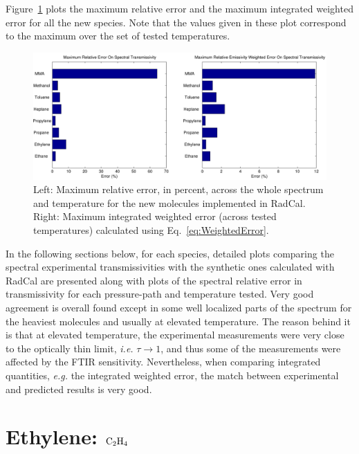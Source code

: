 Figure~\ref{fig:Verify_All} plots the maximum relative error and the maximum integrated weighted error for all the new species. Note that the values given in these plot correspond to the maximum over the set of tested temperatures.

\begin{figure}
\begin{center}
      \includegraphics[width=\textwidth]{../Verification/Results_Test2/Test2_Results.pdf}
\end{center}
 \caption{Left: Maximum relative error, in percent, across the whole spectrum and temperature for the new molecules implemented in RadCal. Right: Maximum integrated weighted error (across tested temperatures) calculated using Eq.~\ref{eq:WeightedError}. \label{fig:Verify_All}}
\end{figure}

In the following sections below, for each species, detailed plots comparing the spectral experimental transmissivities with the synthetic ones calculated with RadCal are presented along with plots of the spectral relative error in transmissivity for each pressure-path and temperature tested. Very good agreement is overall found except in some well localized parts of the spectrum for the heaviest molecules and usually at elevated temperature. The reason behind it is that at elevated temperature, the experimental measurements were very close to the optically thin limit, \textit{i.e.} $\tau \rightarrow 1$, and thus some of the measurements were affected by the FTIR sensitivity. Nevertheless, when comparing integrated quantities, \textit{e.g.} the integrated weighted error, the match between experimental and predicted results is very good.


\clearpage

\section{Ethylene: $\rm C_2H_4$}

